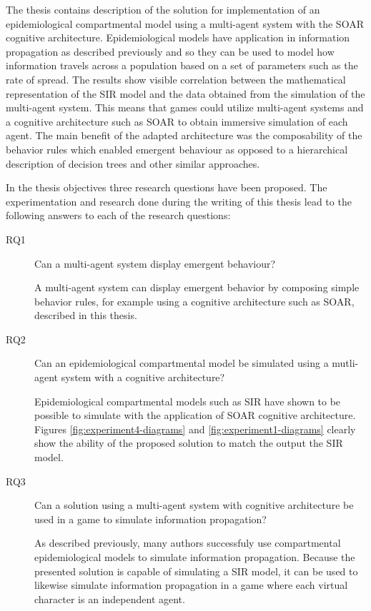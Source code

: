 \label{chapter:conclusions}

The thesis contains description of the solution for implementation of an epidemiological compartmental model using a multi-agent system with the SOAR cognitive architecture.
Epidemiological models have application in information propagation as described previously and so they can be used to model how information travels across a population based on a set of parameters such as the rate of spread.
The results show visible correlation between the mathematical representation of the SIR model and the data obtained from the simulation of the multi-agent system.
This means that games could utilize multi-agent systems and a cognitive architecture such as SOAR to obtain immersive simulation of each agent.
The main benefit of the adapted architecture was the composability of the behavior rules which enabled emergent behaviour as opposed to a hierarchical description of decision trees and other similar approaches.

In the thesis objectives three research questions have been proposed.
The experimentation and research done during the writing of this thesis lead to the following answers to each of the research questions:

\begin{description}
    \item[RQ1] Can a multi-agent system display emergent behaviour?
    \item[] A multi-agent system can display emergent behavior by composing simple behavior rules, for example using a cognitive architecture such as SOAR, described in this thesis.
    \item[RQ2] Can an epidemiological compartmental model be simulated using a mutli-agent system with a cognitive architecture?
    \item[] Epidemiological compartmental models such as SIR have shown to be possible to simulate with the application of SOAR cognitive architecture. Figures \ref{fig:experiment4-diagrams} and \ref{fig:experiment1-diagrams} clearly show the ability of the proposed solution to match the output the SIR model.
    \item[RQ3] Can a solution using a multi-agent system with cognitive architecture be used in a game to simulate information propagation?
    \item[] As described previously, many authors successfuly use compartmental epidemiological models to simulate information propagation. Because the presented solution is capable of simulating a SIR model, it can be used to likewise simulate information propagation in a game where each virtual character is an independent agent.
\end{description}

